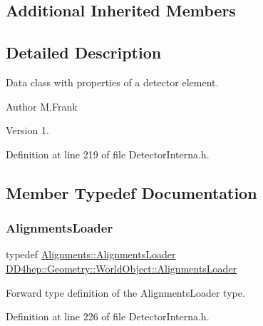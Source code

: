 \subsection*{Additional Inherited Members}


\subsection{Detailed Description}
Data class with properties of a detector element. 

\begin{DoxyAuthor}{Author}
M.\+Frank 
\end{DoxyAuthor}
\begin{DoxyVersion}{Version}
1. 
\end{DoxyVersion}


Definition at line 219 of file Detector\+Interna.\+h.



\subsection{Member Typedef Documentation}
\hypertarget{class_d_d4hep_1_1_geometry_1_1_world_object_a30113114fd4d57fb10e2c39c484813c3}{}\label{class_d_d4hep_1_1_geometry_1_1_world_object_a30113114fd4d57fb10e2c39c484813c3} 
\subsubsection{\texorpdfstring{Alignments\+Loader}{AlignmentsLoader}}
{\footnotesize\ttfamily typedef \hyperlink{class_d_d4hep_1_1_alignments_1_1_alignments_loader}{Alignments\+::\+Alignments\+Loader} \hyperlink{class_d_d4hep_1_1_geometry_1_1_world_object_a30113114fd4d57fb10e2c39c484813c3}{D\+D4hep\+::\+Geometry\+::\+World\+Object\+::\+Alignments\+Loader}}



Forward type definition of the Alignments\+Loader type. 



Definition at line 226 of file Detector\+Interna.\+h.

\hypertarget{class_d_d4hep_1_1_geometry_1_1_world_object_ac5c3ed360e547df41b814ee0c5fddf9f}{}\label{class_d_d4hep_1_1_geometry_1_1_world_object_ac5c3ed360e547df41b814ee0c5fddf9f} 
